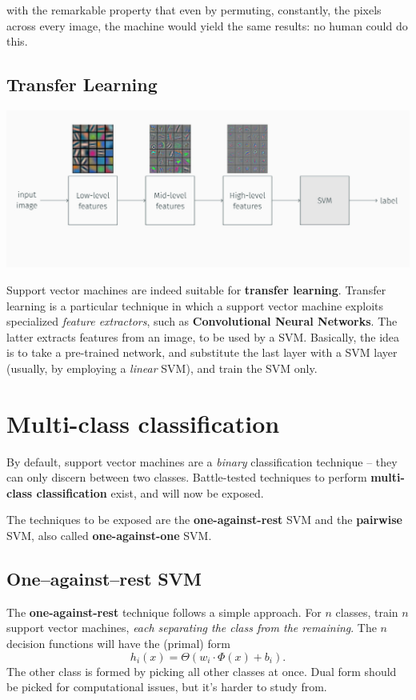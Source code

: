 \documentclass[10pt]{report}
\begin{document}
with the remarkable property that even by permuting, constantly, the pixels
across every image, the machine would yield the same results: no human could do
this.
\subsection{Transfer Learning}
\label{sec:orgc3d648b}
\begin{center}
\includegraphics[width=.9\linewidth]{./pics/svm/transfer-learning.jpg}
\end{center}

Support vector machines are indeed suitable for \textbf{transfer learning}. Transfer
learning is a particular technique in which a support vector machine exploits
specialized \emph{feature extractors}, such as \textbf{Convolutional Neural Networks}. The
latter extracts features from an image, to be used by a SVM. Basically, the idea
is to take a pre\--trained network, and substitute the last layer with a SVM
layer (usually, by employing a \emph{linear} SVM), and train the SVM only.
\section{Multi-class classification}
\label{sec:org8654b84}
By default, support vector machines are a \emph{binary} classification technique --
they can only discern between two classes. Battle\--tested techniques to perform
\textbf{multi\--class classification} exist, and will now be exposed.

The techniques to be exposed are the \textbf{one\--against\--rest} SVM and the
\textbf{pairwise} SVM, also called \textbf{one\--against\--one} SVM.

\subsection{One--against--rest SVM}
\label{sec:org0ae9112}
The \textbf{one\--against\--rest} technique follows a simple approach. For \(n\) classes,
train \(n\) support vector machines, \emph{each separating the class from the
remaining}. The \(n\) decision functions will have the (primal) form $$h_i(x) =
\Theta(w_i \cdot \Phi(x) + b_i).$$ The other class is formed by picking all
other classes at once. Dual form should be picked for computational issues, but
it's harder to study from.
\end{document}

